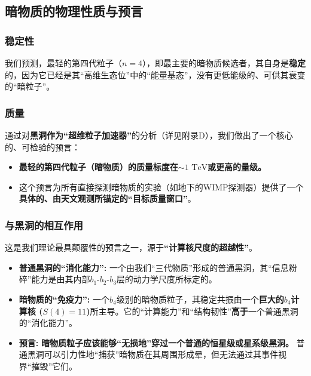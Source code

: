 \documentclass[11pt, a4paper]{article}
\begin{document}
\subsection{暗物质的物理性质与预言}

\subsubsection{稳定性}
我们预测，最轻的第四代粒子（$n=4$），即最主要的暗物质候选者，其自身是\textbf{稳定}的，因为它已经是其“高维生态位”中的“能量基态”，没有更低能级的、可供其衰变的“暗粒子”。

\subsubsection{质量}
通过对\textbf{黑洞作为“超维粒子加速器”}的分析（详见附录D），我们做出了一个核心的、可检验的预言：
\begin{itemize}
    \item \textbf{最轻的第四代粒子（暗物质）的质量标度在$\sim 1 \text{ TeV}$或更高的量级。}
    \item 这个预言为所有直接探测暗物质的实验（如地下的WIMP探测器）提供了一个\textbf{具体的、由天文观测所锚定的“目标质量窗口”}。
\end{itemize}

\subsubsection{与黑洞的相互作用}
这是我们理论最具颠覆性的预言之一，源于\textbf{“计算核尺度的超越性”}。
\begin{itemize}
    \item \textbf{普通黑洞的“消化能力”:} 一个由我们“三代物质”形成的普通黑洞，其“信息粉碎”能力是由其内部$b_1$-$b_2$-$b_3$层的动力学尺度所标定的。
    \item \textbf{暗物质的“免疫力”:} 一个$b_4$级别的暗物质粒子，其稳定共振由一个\textbf{巨大的$b_4$计算核 ($S(4)=11$)}所主导。它的“计算能力”和“结构韧性”\textbf{高于}一个普通黑洞的“消化能力”。
    \item \textbf{预言:} \textbf{暗物质粒子应该能够“无损地”穿过一个普通的恒星级或星系级黑洞。} 普通黑洞可以引力性地“捕获”暗物质在其周围形成晕，但无法通过其事件视界“摧毁”它们。
\end{itemize}
\end{document}
